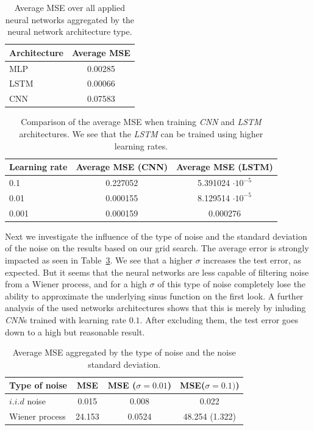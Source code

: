 \documentclass{article}
\begin{document}
\begin{table}
    \centering
    \begin{tabular}{l|c}
        Architecture & Average MSE \\
        \hline
        MLP          & 0.00285     \\
        LSTM         & 0.00066     \\
        CNN          & 0.07583     \\
    \end{tabular}
    \caption{Average MSE over all applied neural networks aggregated by
        the neural network architecture type.}
    \label{tab:noisefree_result}
\end{table}

\begin{table}
    \centering
    \begin{tabular}{l|c|c}
        Learning rate & Average MSE (CNN) & Average MSE (LSTM)       \\
        \hline
        0.1           & 0.227052          & 5.391024 $\cdot 10^{-5}$ \\
        0.01          & 0.000155          & 8.129514 $\cdot 10^{-5}$ \\
        0.001         & 0.000159          & 0.000276                 \\
    \end{tabular}
    \caption{Comparison of the average MSE when training \emph{CNN} and
        \emph{LSTM} architectures. We see that the \emph{LSTM} can be trained
        using higher learning rates.}
    \label{tab:cnn_training}
\end{table}

Next we investigate the influence of the type of noise
and the standard deviation of the noise on the results 
based on our grid search. The average error is
strongly impacted as seen in Table~\ref{tab:wiener_iid}. We see that
a higher $\sigma$ increases the test error, as expected. But it seems that the 
neural networks are less capable of filtering noise from a Wiener process, and 
for a high $\sigma$ of this type of noise completely lose the ability to 
approximate the underlying sinus function on the first look. A further analysis
of the used networks architectures shows that this is merely by inluding 
\emph{CNN}s trained with learning rate $0.1$. After excluding them, the test 
error goes down to a high but reasonable result.

\begin{table}
    \centering
    \begin{tabular}{l|ccc}
        Type of noise & MSE & MSE ($\sigma=0.01$) & MSE($\sigma=0.1)$) \\
        \hline
        $i.i.d$ noise &   0.015 & 0.008  &  0.022 \\
        Wiener process & 24.153 & 0.0524 & 48.254 (1.322) \\
    \end{tabular}
    \caption{Average MSE aggregated by the type of noise and the noise
        standard deviation.}
    \label{tab:wiener_iid}
\end{table}
\end{document}
